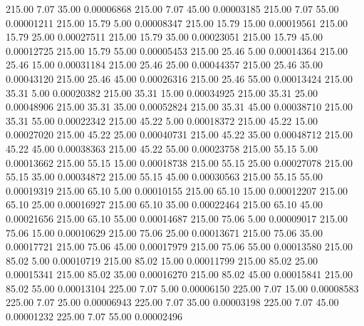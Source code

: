     215.00      7.07     35.00     0.00006868
    215.00      7.07     45.00     0.00003185
    215.00      7.07     55.00     0.00001211
    215.00     15.79      5.00     0.00008347
    215.00     15.79     15.00     0.00019561
    215.00     15.79     25.00     0.00027511
    215.00     15.79     35.00     0.00023051
    215.00     15.79     45.00     0.00012725
    215.00     15.79     55.00     0.00005453
    215.00     25.46      5.00     0.00014364
    215.00     25.46     15.00     0.00031184
    215.00     25.46     25.00     0.00044357
    215.00     25.46     35.00     0.00043120
    215.00     25.46     45.00     0.00026316
    215.00     25.46     55.00     0.00013424
    215.00     35.31      5.00     0.00020382
    215.00     35.31     15.00     0.00034925
    215.00     35.31     25.00     0.00048906
    215.00     35.31     35.00     0.00052824
    215.00     35.31     45.00     0.00038710
    215.00     35.31     55.00     0.00022342
    215.00     45.22      5.00     0.00018372
    215.00     45.22     15.00     0.00027020
    215.00     45.22     25.00     0.00040731
    215.00     45.22     35.00     0.00048712
    215.00     45.22     45.00     0.00038363
    215.00     45.22     55.00     0.00023758
    215.00     55.15      5.00     0.00013662
    215.00     55.15     15.00     0.00018738
    215.00     55.15     25.00     0.00027078
    215.00     55.15     35.00     0.00034872
    215.00     55.15     45.00     0.00030563
    215.00     55.15     55.00     0.00019319
    215.00     65.10      5.00     0.00010155
    215.00     65.10     15.00     0.00012207
    215.00     65.10     25.00     0.00016927
    215.00     65.10     35.00     0.00022464
    215.00     65.10     45.00     0.00021656
    215.00     65.10     55.00     0.00014687
    215.00     75.06      5.00     0.00009017
    215.00     75.06     15.00     0.00010629
    215.00     75.06     25.00     0.00013671
    215.00     75.06     35.00     0.00017721
    215.00     75.06     45.00     0.00017979
    215.00     75.06     55.00     0.00013580
    215.00     85.02      5.00     0.00010719
    215.00     85.02     15.00     0.00011799
    215.00     85.02     25.00     0.00015341
    215.00     85.02     35.00     0.00016270
    215.00     85.02     45.00     0.00015841
    215.00     85.02     55.00     0.00013104
    225.00      7.07      5.00     0.00006150
    225.00      7.07     15.00     0.00008583
    225.00      7.07     25.00     0.00006943
    225.00      7.07     35.00     0.00003198
    225.00      7.07     45.00     0.00001232
    225.00      7.07     55.00     0.00002496
